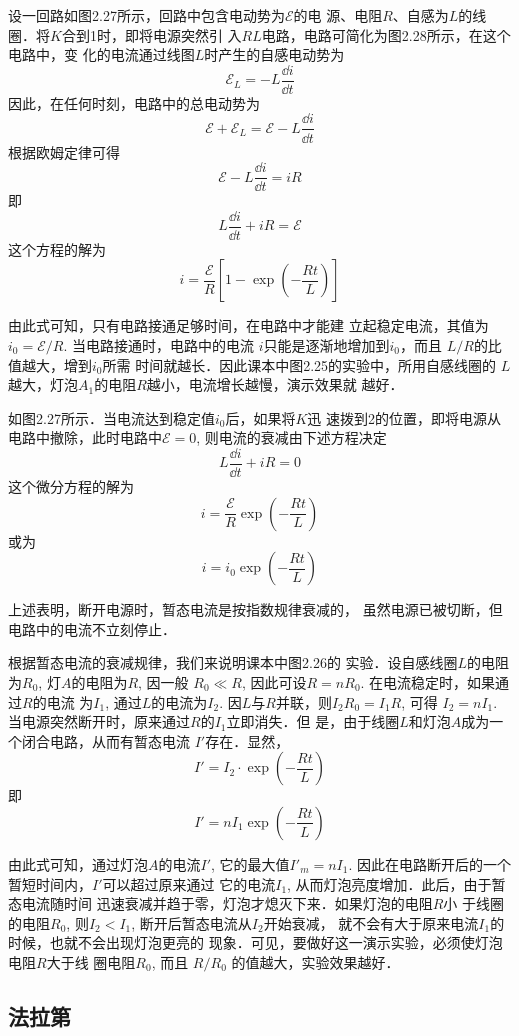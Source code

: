 设一回路如图2.27所示，回路中包含电动势为$\mathcal{E}$的电
源、电阻$R$、自感为$L$的线圈．将$K$合到1时，即将电源突然引
入$RL$电路，电路可简化为图2.28所示，在这个电路中，变
化的电流通过线图$L$时产生的自感电动势为
\[\mathcal{E}_L=-L\frac{\dd i}{\dd t}\]
因此，在任何时刻，电路中的总电动势为
\[\mathcal{E}+\mathcal{E}_L=\mathcal{E}-L\frac{\dd i}{\dd t}\]
根据欧姆定律可得
\[\mathcal{E}-L\frac{\dd i}{\dd t}=iR\]
即
\[L\frac{\dd i}{\dd t}+iR=\mathcal{E}\]
这个方程的解为
\[i= \frac{\mathcal{E}}{R}\left[1-\exp\left(-\frac{Rt}{L}\right)\right] \]

由此式可知，只有电路接通足够时间，在电路中才能建
立起稳定电流，其值为$i_0=\mathcal{E}/{R}$. 
当电路接通时，电路中的电流
$i$只能是逐渐地增加到$i_0$，而且
$L/R$的比值越大，增到$i_0$所需
时间就越长．因此课本中图2.25的实验中，所用自感线圈的
$L$越大，灯泡$A_1$的电阻$R$越小，电流增长越慢，演示效果就
越好．

如图2.27所示．当电流达到稳定值$i_0$后，如果将$K$迅
速拨到2的位置，即将电源从电路中撤除，此时电路中$\mathcal{E}=0$, 
则电流的衰减由下述方程决定
\[L\frac{\dd i}{\dd t}+iR=0\]
这个微分方程的解为
\[i=\frac{\mathcal{E}}{R}\exp\left(-\frac{Rt}{L}\right)\]
或为
\[i=i_0 \exp\left(-\frac{Rt}{L}\right)\]

上述表明，断开电源时，暂态电流是按指数规律衰减的，
虽然电源已被切断，但电路中的电流不立刻停止．

根据暂态电流的衰减规律，我们来说明课本中图2.26的
实验．设自感线圈$L$的电阻为$R_0$, 灯$A$的电阻为$R$, 因一般
$R_0\ll R$, 因此可设$R=nR_0$. 在电流稳定时，如果通过$R$的电流
为$I_1$, 通过$L$的电流为$I_2$. 因$L$与$R$并联，则$I_2R_0=I_1R$, 可得
$I_2=nI_1$. 当电源突然断开时，原来通过$R$的$I_1$立即消失．但
是，由于线圈$L$和灯泡$A$成为一个闭合电路，从而有暂态电流
$I'$存在．显然，
\[I'=I_2\cdot \exp\left(-\frac{Rt}{L}\right)\]
即
\[I'=nI_1 \exp\left(-\frac{Rt}{L}\right)\]

由此式可知，通过灯泡$A$的电流$I'$, 它的最大值$I'_{m}=nI_1$. 
因此在电路断开后的一个暂短时间内，$I'$可以超过原来通过
它的电流$I_1$, 从而灯泡亮度增加．此后，由于暂态电流随时间
迅速衰减并趋于零，灯泡才熄灭下来．如果灯泡的电阻$R$小
于线圈的电阻$R_0$, 则$I_2<I_1$, 断开后暂态电流从$I_2$开始衰减，
就不会有大于原来电流$I_1$的时候，也就不会出现灯泡更亮的
现象．可见，要做好这一演示实验，必须使灯泡电阻$R$大于线
圈电阻$R_0$, 而且
$R/R_0$
的值越大，实验效果越好．




\subsection{法拉第}

